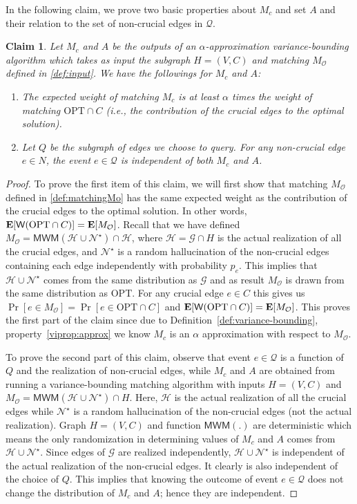 \documentclass[letterpaper,11pt]{article}
\DeclareMathOperator{\E}{\ensuremath{\normalfont \textbf{E}}}
\newcommand{\mc}[1]{\ensuremath{\mathcal{#1}}}
\newcommand{\opt}[0]{\text{OPT}}
\newcommand{\MM}[0]{{\textsf{MWM}}}
\newcommand{\weight}[0]{{\sf{W}}}
\newtheorem{claim}[lemma]{Claim}
\renewcommand{\mc}[1]{\ensuremath{\mathcal{#1}}}
\begin{document}
In the following claim, we prove two basic properties about $M_c$ and set $A$ and their relation to the set of non-crucial edges in $\mc{Q}$.
\begin{claim}\label{claim:approx-ind}
     Let  $M_c$ and $A$ be the outputs of an $\alpha$-approximation variance-bounding algorithm which takes as input 
 the subgraph $H=(V, C)$ and matching $M_{\mc{O}}$ defined in \ref{def:input}. We have the followings for $M_c$ and $A$:
 \begin{enumerate}
     \item The expected weight of matching $M_c$ is at least $\alpha$ times the weight of matching $\opt\cap C$ (i.e., the contribution of the crucial edges to the optimal solution).
     \item Let $Q$ be the subgraph of edges we choose to query. For any non-crucial edge $e\in N$, the event $e\in \mc{Q}$ is independent of both  $M_c$ and $A$.
 \end{enumerate}
\end{claim}

\begin{proof}
    To prove the first item of this claim, we will first show that matching $M_{\mc{O}}$ defined in \ref{def:matchingMo} has the same expected weight as the contribution of the crucial edges to the optimal solution. In other words, $\E[\weight(\opt \cap C)]=\E[M_{\mc{O}}]$. Recall that we have defined $M_{\mc{O}} = \MM(\mc{H}\cup \mc{N^\star})\cap \mc{H}$, where $\mc{H} = \mc{G}\cap H$ is the actual realization of all the crucial edges, and $\mc{N^\star}$ is a random hallucination of the non-crucial edges containing each edge independently with probability $p_e$. This implies that $\mc{H}\cup \mc{N^\star}$ comes from the same distribution as $\mc{G}$ and as result $M_{\mc{O}}$ is drawn from the same distribution as $\opt$. For any crucial edge $e\in C$ this gives us $\Pr[e\in M_{\mc{O}}]= \Pr[e\in \opt \cap C]$ and $\E[\weight(\opt \cap C)]=\E[M_{\mc{O}}]$.  This proves the first part of the claim since due to Definition~\ref{def:variance-bounding}, property~\ref{viprop:approx} we know $M_{c}$ is an $\alpha$ approximation with respect to  $M_{\mc{O}}$. 
    
   To prove the second part of this claim, observe that event $e\in \mc{Q}$ is a function of $Q$ and the realization of non-crucial edges, while $M_{c}$  and $A$ are obtained from running a variance-bounding matching algorithm with inputs $H=(V,C)$ and $M_{\mc{O}} = \MM(\mc{H}\cup \mc{N^\star})\cap H$. Here, $\mc{H}$ is the actual realization of all the crucial edges while $\mc{N^\star}$ is a random hallucination of the non-crucial edges (not the actual realization). Graph $H=(V,C)$ and function $\MM(.)$ are deterministic which means the only randomization in determining  values of $M_{c}$  and $A$ comes from $\mc{H}\cup \mc{N^\star}$.  Since edges of $\mc{G}$ are realized independently, $\mc{H}\cup \mc{N^\star}$ is independent  of the actual realization of the non-crucial edges. It clearly is also independent of the choice of $Q$. This implies that knowing  the outcome of  event $e\in \mc{Q}$ does not change the distribution of  $M_{c}$  and $A$;  hence they are independent. 
\end{proof}
\end{document}
